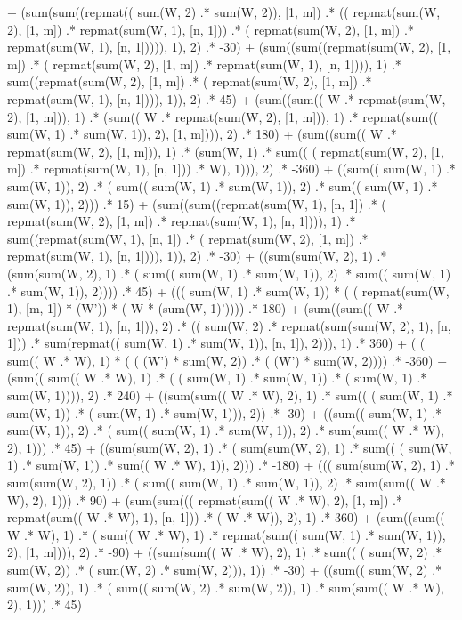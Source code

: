 \documentclass{article}
\begin{document}
  + (sum(sum((repmat(( sum(W, 2) .* sum(W, 2)), [1, m])  .* (( repmat(sum(W, 2), [1, m]) .* repmat(sum(W, 1), [n, 1]))  .* ( repmat(sum(W, 2), [1, m]) .* repmat(sum(W, 1), [n, 1])))), 1), 2)  .* -30) 
  + (sum((sum((repmat(sum(W, 2), [1, m])  .* ( repmat(sum(W, 2), [1, m]) .* repmat(sum(W, 1), [n, 1]))), 1)  .* sum((repmat(sum(W, 2), [1, m])  .* ( repmat(sum(W, 2), [1, m]) .* repmat(sum(W, 1), [n, 1]))), 1)), 2)  .* 45) 
  + (sum((sum(( W .* repmat(sum(W, 2), [1, m])), 1)  .* (sum(( W .* repmat(sum(W, 2), [1, m])), 1)  .* repmat(sum(( sum(W, 1) .* sum(W, 1)), 2), [1, m]))), 2)  .* 180) 
  + (sum((sum(( W .* repmat(sum(W, 2), [1, m])), 1)  .* (sum(W, 1)  .* sum(( ( repmat(sum(W, 2), [1, m]) .* repmat(sum(W, 1), [n, 1])) .* W), 1))), 2)  .* -360) 
  + ((sum(( sum(W, 1) .* sum(W, 1)), 2)  .* ( sum(( sum(W, 1) .* sum(W, 1)), 2) .* sum(( sum(W, 1) .* sum(W, 1)), 2)))  .* 15) 
  + (sum((sum((repmat(sum(W, 1), [n, 1])  .* ( repmat(sum(W, 2), [1, m]) .* repmat(sum(W, 1), [n, 1]))), 1)  .* sum((repmat(sum(W, 1), [n, 1])  .* ( repmat(sum(W, 2), [1, m]) .* repmat(sum(W, 1), [n, 1]))), 1)), 2)  .* -30) 
  + ((sum(sum(W, 2), 1)  .* (sum(sum(W, 2), 1)  .* ( sum(( sum(W, 1) .* sum(W, 1)), 2) .* sum(( sum(W, 1) .* sum(W, 1)), 2))))  .* 45) 
  + ((( sum(W, 1) .* sum(W, 1))  * ( ( repmat(sum(W, 1), [m, 1]) * (W')) * ( W * (sum(W, 1)'))))  .* 180) 
  + (sum((sum(( W .* repmat(sum(W, 1), [n, 1])), 2)  .* (( sum(W, 2) .* repmat(sum(sum(W, 2), 1), [n, 1]))  .* sum(repmat(( sum(W, 1) .* sum(W, 1)), [n, 1]), 2))), 1)  .* 360) 
  + ( ( sum(( W .* W), 1) * ( ( (W') * sum(W, 2)) .* ( (W') * sum(W, 2)))) .* -360) 
  + (sum(( sum(( W .* W), 1) .* ( ( sum(W, 1) .* sum(W, 1)) .* ( sum(W, 1) .* sum(W, 1)))), 2)  .* 240) 
  + ((sum(sum(( W .* W), 2), 1)  .* sum(( ( sum(W, 1) .* sum(W, 1)) .* ( sum(W, 1) .* sum(W, 1))), 2))  .* -30) 
  + ((sum(( sum(W, 1) .* sum(W, 1)), 2)  .* ( sum(( sum(W, 1) .* sum(W, 1)), 2) .* sum(sum(( W .* W), 2), 1)))  .* 45) 
  + ((sum(sum(W, 2), 1)  .* ( sum(sum(W, 2), 1) .* sum(( ( sum(W, 1) .* sum(W, 1)) .* sum(( W .* W), 1)), 2)))  .* -180) 
  + ((( sum(sum(W, 2), 1) .* sum(sum(W, 2), 1))  .* ( sum(( sum(W, 1) .* sum(W, 1)), 2) .* sum(sum(( W .* W), 2), 1)))  .* 90) 
  + (sum(sum((( repmat(sum(( W .* W), 2), [1, m]) .* repmat(sum(( W .* W), 1), [n, 1]))  .* ( W .* W)), 2), 1)  .* 360) 
  + (sum((sum(( W .* W), 1)  .* ( sum(( W .* W), 1) .* repmat(sum(( sum(W, 1) .* sum(W, 1)), 2), [1, m]))), 2)  .* -90) 
  + ((sum(sum(( W .* W), 2), 1)  .* sum(( ( sum(W, 2) .* sum(W, 2)) .* ( sum(W, 2) .* sum(W, 2))), 1))  .* -30) 
  + ((sum(( sum(W, 2) .* sum(W, 2)), 1)  .* ( sum(( sum(W, 2) .* sum(W, 2)), 1) .* sum(sum(( W .* W), 2), 1)))  .* 45) 
\end{document}

